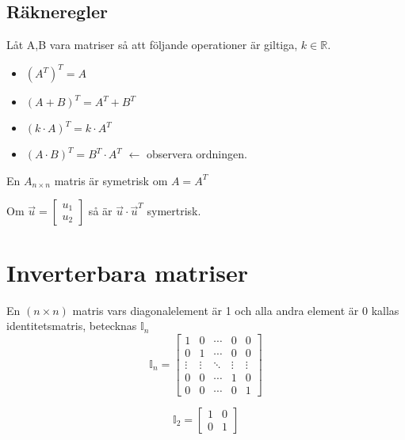 \subsection{Räkneregler} %
\label{sub:r_kneregler2}
Låt A,B vara matriser så att följande operationer är giltiga, $k \in \mathbb{R}$.
\begin{itemize}
	\item $(A^T)^T = A$
	\item $(A + B)^T = A^T + B^T$
	\item $(k \cdot A)^T = k \cdot A^T$
	\item $(A \cdot B)^T = B^T \cdot A^T$ $\leftarrow$ observera ordningen.
\end{itemize}
\begin{Def}
    En $A_{n \times n}$ matris är symetrisk om $A = A^T$
\end{Def}
\begin{Ex}
    Om $\vec{u} = \begin{bmatrix} u_1\\u_2 \end{bmatrix}$ så är $\vec{u} \cdot \vec{u}^T$ symertrisk.
\end{Ex}

\section{Inverterbara matriser} %
\label{sec:inverterbara_matriser}
\begin{Def}
    En $(n \times n)$ matris vars diagonalelement är 1 och alla andra element är 0 kallas identitetsmatris, betecknas $\mathbb{I}_n$
    \[
        \mathbb{I}_n = \begin{bmatrix} 1&0&\cdots&0&0\\ 
        0&1&\cdots&0&0 \\ 
        \vdots&\vdots&\ddots&\vdots&\vdots \\ 
        0&0&\cdots&1&0 \\ 
        0&0&\cdots&0&1 \end{bmatrix}
    \]
\end{Def}
\begin{Ex}
    \[
        \mathbb{I}_2 = \begin{bmatrix} 1&0\\0&1 \end{bmatrix}
    \]
\end{Ex}

